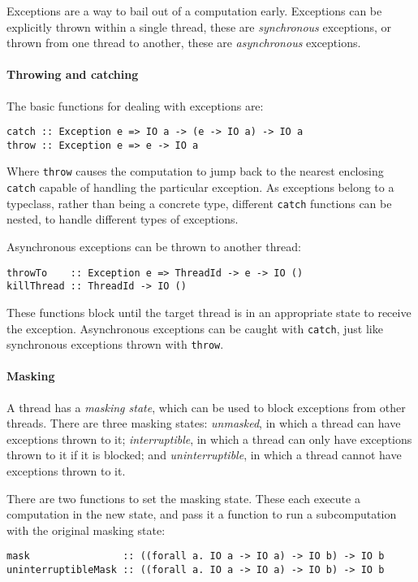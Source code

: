 Exceptions are a way to bail out of a computation early.  Exceptions can be
explicitly thrown within a single thread, these are \emph{synchronous}
exceptions, or thrown from one thread to another, these are \emph{asynchronous}
exceptions.

\paragraph{Throwing and catching}
The basic functions for dealing with exceptions are:

\begin{verbatim}
catch :: Exception e => IO a -> (e -> IO a) -> IO a
throw :: Exception e => e -> IO a
\end{verbatim}

Where \verb|throw| causes the computation to jump back to the nearest enclosing
\verb|catch| capable of handling the particular exception. As exceptions belong
to a typeclass, rather than being a concrete type, different \verb|catch|
functions can be nested, to handle different types of exceptions.

Asynchronous exceptions can be thrown to another thread:

\begin{verbatim}
throwTo    :: Exception e => ThreadId -> e -> IO ()
killThread :: ThreadId -> IO ()
\end{verbatim}

These functions block until the target thread is in an appropriate state to
receive the exception.  Asynchronous exceptions can be caught with \verb|catch|,
just like synchronous exceptions thrown with \verb|throw|.

\paragraph{Masking}
A thread has a \emph{masking state}, which can be used to block exceptions from
other threads.  There are three masking states: \emph{unmasked}, in which a
thread can have exceptions thrown to it; \emph{interruptible}, in which a thread
can only have exceptions thrown to it if it is blocked; and
\emph{uninterruptible}, in which a thread cannot have exceptions thrown to it.

There are two functions to set the masking state.  These each execute a
computation in the new state, and pass it a function to run a subcomputation
with the original masking state:

\begin{verbatim}
mask                :: ((forall a. IO a -> IO a) -> IO b) -> IO b
uninterruptibleMask :: ((forall a. IO a -> IO a) -> IO b) -> IO b
\end{verbatim}

